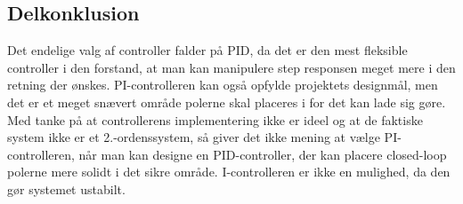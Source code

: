\subsection{Delkonklusion}

Det endelige valg af controller falder på PID, da det er den mest fleksible controller i den forstand, at man kan manipulere step responsen meget mere i den retning der ønskes. PI-controlleren kan også opfylde projektets designmål, men det er et meget snævert område polerne skal placeres i for det kan lade sig gøre. Med tanke på at controllerens implementering ikke er ideel og at de faktiske system ikke er et 2.-ordenssystem, så giver det ikke mening at vælge PI-controlleren, når man kan designe en PID-controller, der kan placere closed-loop polerne mere solidt i det sikre område. I-controlleren er ikke en mulighed, da den gør systemet ustabilt.